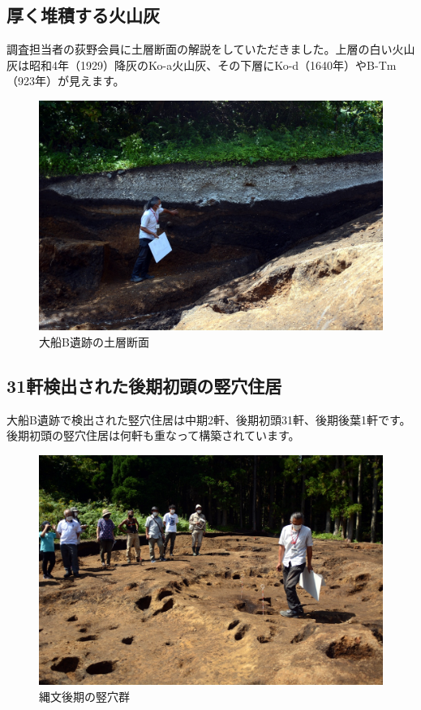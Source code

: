 \documentclass[a4j,11pt,twocolumn,openany]{jsbook}
\begin{document}
\subsection{厚く堆積する火山灰}

調査担当者の荻野会員に土層断面の解説をしていただきました。上層の白い火山灰は昭和4年（1929）降灰のKo-a火山灰、その下層にKo-d（1640年）やB-Tm（923年）が見えます。

\begin{figure}[ht]
	\centering
	\includegraphics[width=\linewidth]{fig/01_Iseki_kengaku/10_OfuneB_section.JPG}
	\caption{大船B遺跡の土層断面}
	\label{}
\end{figure}

\subsection{31軒検出された後期初頭の竪穴住居}

大船B遺跡で検出された竪穴住居は中期2軒、後期初頭31軒、後期後葉1軒です。後期初頭の竪穴住居は何軒も重なって構築されています。

\begin{figure}[ht]
	\centering
	\includegraphics[width=\linewidth]{fig/01_Iseki_kengaku/11_Ofune_house.JPG}
	\caption{縄文後期の竪穴群}
	\label{}
\end{figure}
\end{document}
